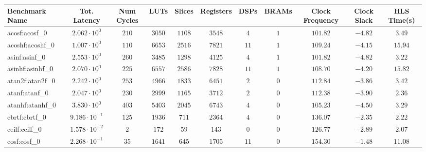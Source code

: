 \begin{tabular}{|l|c|c|c|c|c|c|c|c|c|c|}
\hline
Benchmark Name               & Tot. Latency            & Num Cycles & LUTs       & Slices    & Registers  & DSPs    & BRAMs & Clock Frequency & Clock Slack & HLS Time(s) \\
\hline
acosf:acosf\_0               & $ 2.062 \cdot 10^{0}  $ & $ 210    $ & $ 3050   $ & $ 1108  $ & $ 3548   $ & $ 4   $ & $ 1 $ & $ 101.82      $ & $ -4.82   $ & $ 3.49    $ \\
acoshf:acoshf\_0             & $ 1.007 \cdot 10^{0}  $ & $ 110    $ & $ 6653   $ & $ 2516  $ & $ 7821   $ & $ 11  $ & $ 1 $ & $ 109.24      $ & $ -4.15   $ & $ 15.94   $ \\
asinf:asinf\_0               & $ 2.553 \cdot 10^{0}  $ & $ 260    $ & $ 3485   $ & $ 1298  $ & $ 4125   $ & $ 4   $ & $ 1 $ & $ 101.82      $ & $ -4.82   $ & $ 3.22    $ \\
asinhf:asinhf\_0             & $ 2.070 \cdot 10^{0}  $ & $ 225    $ & $ 6557   $ & $ 2586  $ & $ 7828   $ & $ 11  $ & $ 1 $ & $ 108.70      $ & $ -4.20   $ & $ 15.82   $ \\
atan2f:atan2f\_0             & $ 2.242 \cdot 10^{0}  $ & $ 253    $ & $ 4966   $ & $ 1833  $ & $ 6451   $ & $ 2   $ & $ 0 $ & $ 112.84      $ & $ -3.86   $ & $ 3.42    $ \\
atanf:atanf\_0               & $ 2.047 \cdot 10^{0}  $ & $ 230    $ & $ 2999   $ & $ 1165  $ & $ 3712   $ & $ 2   $ & $ 0 $ & $ 112.38      $ & $ -3.90   $ & $ 2.36    $ \\
atanhf:atanhf\_0             & $ 3.830 \cdot 10^{0}  $ & $ 403    $ & $ 5403   $ & $ 2045  $ & $ 6743   $ & $ 4   $ & $ 0 $ & $ 105.23      $ & $ -4.50   $ & $ 3.29    $ \\
cbrtf:cbrtf\_0               & $ 9.186 \cdot 10^{-1} $ & $ 125    $ & $ 1936   $ & $ 711   $ & $ 2364   $ & $ 4   $ & $ 0 $ & $ 136.07      $ & $ -2.35   $ & $ 2.22    $ \\
ceilf:ceilf\_0               & $ 1.578 \cdot 10^{-2} $ & $ 2      $ & $ 172    $ & $ 59    $ & $ 143    $ & $ 0   $ & $ 0 $ & $ 126.77      $ & $ -2.89   $ & $ 2.07    $ \\
cosf:cosf\_0                 & $ 2.268 \cdot 10^{-1} $ & $ 35     $ & $ 1641   $ & $ 645   $ & $ 1705   $ & $ 11  $ & $ 0 $ & $ 154.30      $ & $ -1.48   $ & $ 11.08   $ \\

\end{tabular}
